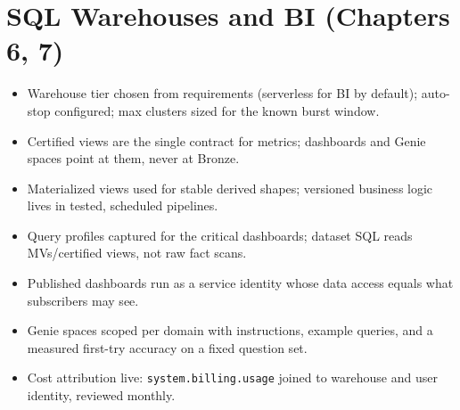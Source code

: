 \section{SQL Warehouses and BI (Chapters 6, 7)}
%
\begin{itemize}
    \item[$\square$] Warehouse tier chosen from requirements (serverless for BI by default);
    auto-stop configured; max clusters sized for the known burst window.
    \item[$\square$] Certified views are the single contract for metrics; dashboards and Genie
    spaces point at them, never at Bronze.
    \item[$\square$] Materialized views used for stable derived shapes; versioned business logic
    lives in tested, scheduled pipelines.
    \item[$\square$] Query profiles captured for the critical dashboards; dataset SQL reads
    MVs/certified views, not raw fact scans.
    \item[$\square$] Published dashboards run as a service identity whose data access equals
    what subscribers may see.
    \item[$\square$] Genie spaces scoped per domain with instructions, example queries, and a
    measured first-try accuracy on a fixed question set.
    \item[$\square$] Cost attribution live: \texttt{system.billing.usage} joined to warehouse and
    user identity, reviewed monthly.
\end{itemize}

